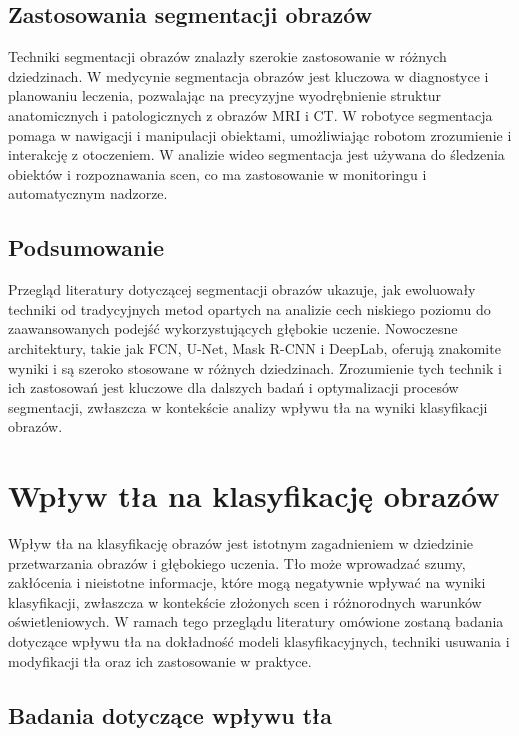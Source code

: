 \subsection*{Zastosowania segmentacji obrazów}

Techniki segmentacji obrazów znalazły szerokie zastosowanie w różnych dziedzinach. 
W medycynie segmentacja obrazów jest kluczowa w diagnostyce i planowaniu leczenia, 
pozwalając na precyzyjne wyodrębnienie struktur anatomicznych i patologicznych z obrazów MRI i CT. 
W robotyce segmentacja pomaga w nawigacji i manipulacji obiektami, umożliwiając robotom 
zrozumienie i interakcję z otoczeniem. W analizie wideo segmentacja jest używana do śledzenia 
obiektów i rozpoznawania scen, co ma zastosowanie w monitoringu i automatycznym nadzorze.

\subsection*{Podsumowanie}

Przegląd literatury dotyczącej segmentacji obrazów ukazuje, jak ewoluowały techniki od tradycyjnych 
metod opartych na analizie cech niskiego poziomu do zaawansowanych podejść wykorzystujących głębokie 
uczenie. Nowoczesne architektury, takie jak FCN, U-Net, Mask R-CNN i DeepLab, oferują znakomite wyniki 
i są szeroko stosowane w różnych dziedzinach. Zrozumienie tych technik i ich zastosowań jest kluczowe 
dla dalszych badań i optymalizacji procesów segmentacji, zwłaszcza w kontekście analizy wpływu tła na 
wyniki klasyfikacji obrazów.


\section*{Wpływ tła na klasyfikację obrazów}

Wpływ tła na klasyfikację obrazów jest istotnym zagadnieniem w dziedzinie przetwarzania obrazów i 
głębokiego uczenia. Tło może wprowadzać szumy, zakłócenia i nieistotne informacje, które mogą 
negatywnie wpływać na wyniki klasyfikacji, zwłaszcza w kontekście złożonych scen i różnorodnych 
warunków oświetleniowych. W ramach tego przeglądu literatury omówione zostaną badania dotyczące 
wpływu tła na dokładność modeli klasyfikacyjnych, techniki usuwania i modyfikacji tła oraz ich 
zastosowanie w praktyce.

\subsection*{Badania dotyczące wpływu tła}

